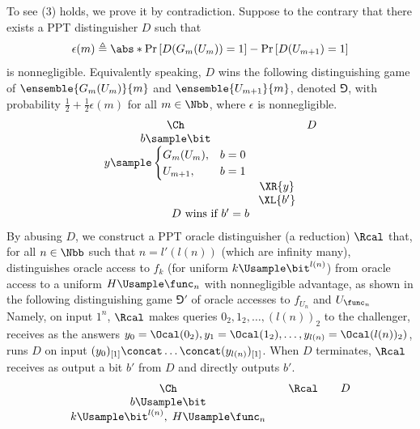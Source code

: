 \begin{answer}[c]
    To see (3) holds, we prove it by contradiction. Suppose to the contrary that there exists a PPT distinguisher $D$ such that
    \begin{equation}\label{eq:p3-3-1}
        \epsilon(m) \triangleq \abs*{\Pr\left[D(G_m(U_m)) =1\right] - \Pr\left[D(U_{m+1}) =1\right]}
    \end{equation}
    is nonnegligible. Equivalently speaking, $D$ wins the following distinguishing game of $\ensemble{G_m(U_m)}{m}$ and $\ensemble{U_{m+1}}{m}$, denoted $\Game$, with probability $\frac{1}{2}+\frac{1}{2}\epsilon(m)$ for all $m\in\Nbb$, where $\epsilon$ is nonnegligible.
    {
        \[
            \begin{array}{@{} c c c @{}}
            \Ch & & D \\
            b\sample \bit & & \\
            y\sample \begin{cases}
                G_m(U_m), & b=0\\
                U_{m+1}, & b=1
            \end{cases}& & \\
            & \XR{y} & \\
            & \XL{b'} & \\
            \multicolumn{3}{c}{\text{$D$ wins if $b' = b$}}
            \end{array}
        \]
        \label{fig:p3-game5}
    }
    By abusing $D$, we construct a PPT oracle distinguisher (a reduction) $\Rcal$ that, for all $n\in\Nbb$ such that $n=l'(l(n))$ (which are infinity many), distinguishes oracle access to $f_k$ (for uniform $k\Usample \bit^{l(n)}$) from oracle access to a uniform $H\Usample\func_n$ with nonnegligible advantage, as shown in the following distinguishing game $\Game'$ of oracle accesses to $f_{U_n}$ and $U_{\func_n}$
    Namely, on input $1^n$, $\Rcal$ makes queries $0_2,1_2,\ldots,(l(n))_2$ to the challenger, receives as the answers $y_0=\Ocal(0_2),y_1=\Ocal(1_2),\ldots,y_{l(n)}=\Ocal(l(n))_2)$, runs $D$ on input $(y_0)_{[1]}\concat\ldots\concat(y_{l(n)})_{[1]}$. When $D$ terminates, $\Rcal$ receives as output a bit $b'$ from $D$ and directly outputs $b'$.
    {
        \[
            \begin{array}{@{} c c c c c@{}}
            \Ch & & \Rcal & & D \\
            b\Usample\bit & & & & \\
            k\Usample\bit^{l(n)},\; H\Usample \func_n & & & & \\

\end{array}\]}
\end{answer}
